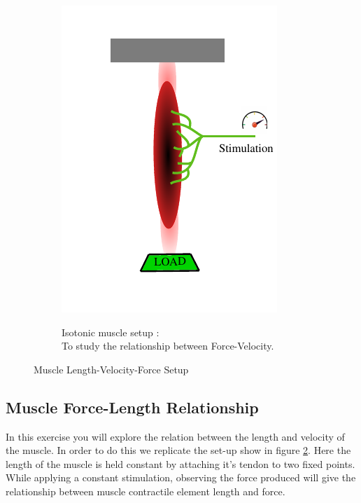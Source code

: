 \documentclass{cmc}
\begin{document}
\begin{figure}[H]
\begin{subfigure}[b]{0.49\textwidth}
{      \includegraphics[width=\textwidth]{figures/isotonic_muscle}
      \label{fig:isotonic_muscle}
    }
    \caption{Isotonic muscle setup :\\ To study the relationship
      between Force-Velocity.}
  \end{subfigure}
  \caption{Muscle Length-Velocity-Force Setup}
  \label{fig:muscle-setup}
\end{figure}

\subsection*{Muscle Force-Length Relationship}
\label{sec:muscle-force-length}
In this exercise you will explore the relation between the length and
velocity of the muscle. In order to do this we replicate the set-up
show in figure \ref{fig:muscle-setup}. Here the length of the muscle is
held constant by attaching it's tendon to two fixed points. While
applying a constant stimulation, observing the force produced will
give the relationship between muscle contractile element length and
force.
\end{document}
